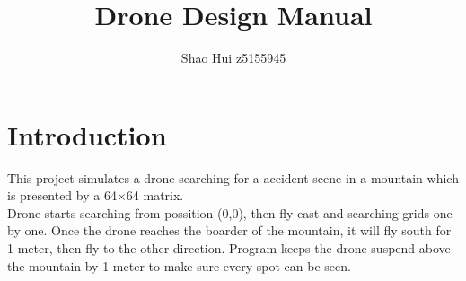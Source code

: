 \documentclass[a4paper, 12 pt]{report}
\begin{document}
\title{Drone Design Manual}
\author{Shao Hui z5155945}
\date{}
\maketitle
\pagestyle{empty}
\setcounter{section}{0}
\tableofcontents
\newpage

\section{Introduction}
This project simulates a drone searching for a accident scene in a mountain which is presented by a 64$\times$64 matrix.\\
Drone starts searching from possition (0,0), then fly east and searching grids one by one.
Once the drone reaches the boarder of the mountain, it will fly south for 1 meter, then fly to the other direction.
Program keeps the drone suspend above the mountain by 1 meter to make sure every spot can be seen.\\



\newpage
\end{document}
